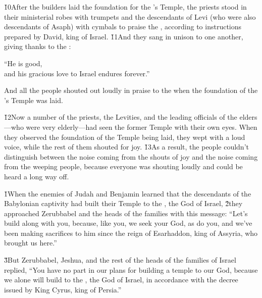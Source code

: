 \v{10}After the builders laid the foundation for the 's Temple, the priests stood in their ministerial robes with trumpets and the descendants of Levi (who were also descendants of Asaph) with cymbals to praise the , according to instructions prepared by David, king of Israel. \v{11}And they sang in unison to one another, giving thanks to the :

\begin{poetry}
\poeml ``He is good, \\
\poemll    and his gracious love to Israel endures forever.''
\end{poetry}

And all the people shouted out loudly in praise to the  when the foundation of the 's Temple was laid.

\v{12}Now a number of the priests, the Levities, and the leading officials of the elders---who were very elderly---had seen the former Temple with their own eyes. When they observed the foundation of the Temple being laid, they wept with a loud voice, while the rest of them shouted for joy. \v{13}As a result, the people couldn't distinguish between the noise coming from the shouts of joy and the noise coming from the weeping people, because everyone was shouting loudly and could be heard a long way off.

\v{1}When the enemies of Judah and Benjamin learned that the descendants of the Babylonian captivity had built their Temple to the , the God of Israel, \v{2}they approached Zerubbabel and the heads of the families with this message: ``Let's build along with you, because, like you, we seek your God, as do you, and we've been making sacrifices to him since the reign of Esarhaddon, king of Assyria, who brought us here.''

\v{3}But Zerubbabel, Jeshua, and the rest of the heads of the families of Israel replied, ``You have no part in our plans for building a temple to our God, because we alone will build to the , the God of Israel, in accordance with the decree issued by King Cyrus, king of Persia.''

